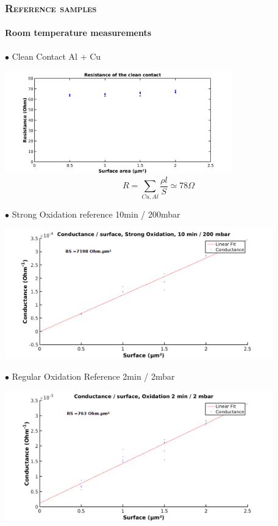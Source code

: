 \documentclass{beamer}
\begin{document}
\begin{frame}
\begin{tikzpicture}[scale=0.6]
                \end{tikzpicture}
                
    \end{frame}

    \begin{frame}[allowframebreaks]
        \frametitle{\textsc{Reference samples}}
        \framesubtitle{Room temperature measurements}
            $\bullet$  Clean Contact Al + Cu
            \vspace{0.3cm}
            
            \begin{center}
            \includegraphics[width=280pt]{Rclean.png}
            \[R=\sum_{Cu,Al}\dfrac{\rho l}{S}\simeq 78 \Omega\]
            \end{center}
            
            $\bullet$  Strong Oxidation reference 10min / 200mbar
            \vspace{0.5cm}
            
            \includegraphics[width=330pt]{ConductanceFitStrongOx.png}
             \vspace{1cm}
             
            $\bullet$  Regular Oxidation Reference 2min / 2mbar
            \vspace{0.5cm}
            
            \includegraphics[width=330pt]{ConductanceFitOx.png}
    \end{frame}
    
\end{document}
